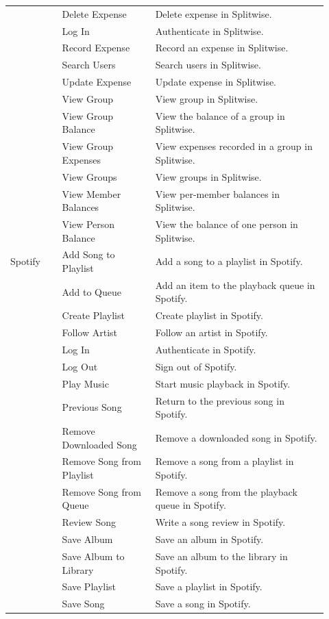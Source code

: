 \documentclass{llmxive}
\begin{document}
\begin{longtable}{@{}p{0.15\linewidth}p{0.27\linewidth}p{0.50\linewidth}@{}}
 & Delete Expense & Delete expense in Splitwise. \\
 & Log In & Authenticate in Splitwise. \\
 & Record Expense & Record an expense in Splitwise. \\
 & Search Users & Search users in Splitwise. \\
 & Update Expense & Update expense in Splitwise. \\
 & View Group & View group in Splitwise. \\
 & View Group Balance & View the balance of a group in Splitwise. \\
 & View Group Expenses & View expenses recorded in a group in Splitwise. \\
 & View Groups & View groups in Splitwise. \\
 & View Member Balances & View per-member balances in Splitwise. \\
 & View Person Balance & View the balance of one person in Splitwise. \\
\midrule
Spotify & Add Song to Playlist & Add a song to a playlist in Spotify. \\
 & Add to Queue & Add an item to the playback queue in Spotify. \\
 & Create Playlist & Create playlist in Spotify. \\
 & Follow Artist & Follow an artist in Spotify. \\
 & Log In & Authenticate in Spotify. \\
 & Log Out & Sign out of Spotify. \\
 & Play Music & Start music playback in Spotify. \\
 & Previous Song & Return to the previous song in Spotify. \\
 & Remove Downloaded Song & Remove a downloaded song in Spotify. \\
 & Remove Song from Playlist & Remove a song from a playlist in Spotify. \\
 & Remove Song from Queue & Remove a song from the playback queue in Spotify. \\
 & Review Song & Write a song review in Spotify. \\
 & Save Album & Save an album in Spotify. \\
 & Save Album to Library & Save an album to the library in Spotify. \\
 & Save Playlist & Save a playlist in Spotify. \\
 & Save Song & Save a song in Spotify. \\

\end{longtable}
\end{document}
